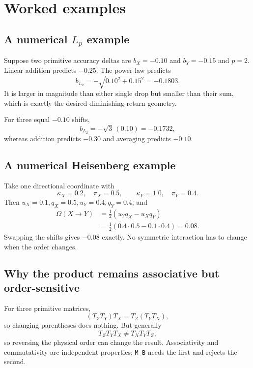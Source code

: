 \documentclass[11pt,a4paper]{article}
\newcommand{\MB}{\texttt{M\_B}}
\begin{document}
\section{Worked examples}

\subsection{A numerical $L_p$ example}

Suppose two primitive accuracy deltas are $b_X=-0.10$ and $b_Y=-0.15$ and
$p=2$.  Linear addition predicts $-0.25$.  The power law predicts
\[
b_{L_2}=-\sqrt{0.10^2+0.15^2}=-0.1803.
\]
It is larger in magnitude than either single drop but smaller than their sum,
which is exactly the desired diminishing-return geometry.

For three equal $-0.10$ shifts,
\[
b_{L_2}=-\sqrt{3}\,(0.10)=-0.1732,
\]
whereas addition predicts $-0.30$ and averaging predicts $-0.10$.

\subsection{A numerical Heisenberg example}

Take one directional coordinate with
\[
\kappa_X=0.2,\quad\pi_X=0.5,
\qquad
\kappa_Y=1.0,\quad\pi_Y=0.4.
\]
Then $u_X=0.1,q_X=0.5,u_Y=0.4,q_Y=0.4$, and
\begin{align}
\Omega(X\to Y)
&=\tfrac12(u_Yq_X-u_Xq_Y)\\
&=\tfrac12(0.4\cdot0.5-0.1\cdot0.4)=0.08.
\end{align}
Swapping the shifts gives $-0.08$ exactly.  No symmetric interaction has to
change when the order changes.

\subsection{Why the product remains associative but order-sensitive}

For three primitive matrices,
\[
(T_ZT_Y)T_X=T_Z(T_YT_X),
\]
so changing parentheses does nothing.  But generally
\[
T_ZT_YT_X\ne T_XT_YT_Z,
\]
so reversing the physical order can change the result.  Associativity and
commutativity are independent properties; \MB{} needs the first and rejects
the second.

\end{document}
